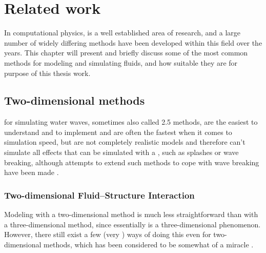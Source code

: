 \chapter{Related work}
\label{chap:relatedwork}


In computational physics, \CFD is a well established area of research, and a large number of widely differing methods have been developed within this field over the years. This chapter will present and briefly discuss some of the most common methods for modeling and simulating fluids, and how suitable they are for purpose of this thesis work.

\section{Two-dimensional methods}

 for simulating water waves, sometimes also called 2.5 methods, are the easiest to understand and to implement and are often the fastest when it comes to simulation speed, but are not completely realistic models and therefore can't simulate all effects that can be simulated with a , such as splashes or wave breaking, although attempts to extend such methods to cope with wave breaking have been made \citep[e.g.][]{Miklos2009}.

\subsection{Two-dimensional Fluid--Structure Interaction}

\label{sec:fluid_structure_interaction}

Modeling \FSI with a two-dimensional method is much less straightforward than with a three-dimensional method, since \FSI essentially is a three-dimensional phenomenon. However, there still exist a few (very \approximating) ways of doing this even for two-dimensional methods, which has been considered to be somewhat of a miracle \citep{Tessendorf2004}.

